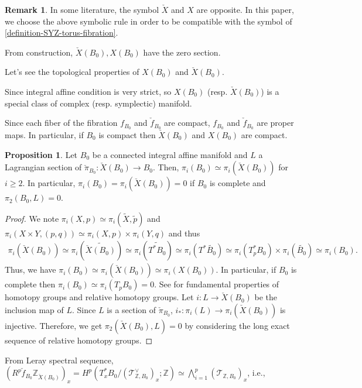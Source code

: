 \documentclass[a4paper,dvipdfmx,reqno,12pt]{amsart}
\theoremstyle{definition}
\newtheorem{proposition}[theorem]{Proposition}
\newtheorem{remark}[theorem]{Remark}
\newcommand{\Z}{\mathbb{Z}}%
\newcommand{\mcal}[1]{\mathcal{#1}}%
\newcommand{\TBZ}{\mcal{T}_{\Z,B_0}}
\numberwithin{equation}{section}
\begin{document}
\begin{remark}
In some literature, the symbol $\check{X}$ and
$X$ are opposite. In this paper, we choose the above
symbolic rule in order to be compatible with the symbol of 
\cref{definition-SYZ-torus-fibration}.
\end{remark}

From construction, $\check{X}(B_0), X(B_0)$ have the zero section.

Let's see the topological properties of $X(B_0)$ and $\check{X}(B_0)$.

Since integral affine condition is very strict, so $X(B_0)$ (resp. $\check{X}(B_0)$) is a special class of complex (resp. symplectic) manifold.

Since each fiber of the fibration $f_{B_0}$ and $\check{f}_{B_0}$ are compact, $f_{B_0}$ and $\check{f}_{B_0}$ are proper maps. In particular, if $B_0$ is compact then $\check{X}(B_0)$ and $X(B_0)$ are compact.

\begin{proposition}
\label{proposition-unobstructed-lagrangian}
Let $B_0$ be a connected integral affine manifold 
and $L$ a Lagrangian section of 
$\check{\pi}_{B_0}\colon \check{X}(B_0)\to B_0$. 
Then, $\pi_i(B_0)\simeq \pi_i(\check{X}(B_0))$ 
for $i\geq 2$.
In particular, 
$\pi_i(B_0)=\pi_i(\check{X}(B_0))=0$ if 
$B_0$ is complete and $\pi_2(B_0,L)=0$.
\end{proposition}
\begin{proof}
We note $\pi_{i}(X,p)\simeq \pi_{i}(\widetilde{X},\tilde{p})$ and $\pi_{i}(X\times Y,(p,q))\simeq \pi_i(X,p)\times \pi_i(Y,q)$ and thus
\begin{align}
\pi_{i}(\check{X}(B_0))\simeq 
\pi_{i}(\widetilde{\check{X}(B_0)})\simeq 
\pi_{i}(\widetilde{T^{*}B_0})\simeq 
\pi_{i}(T^{*}\widetilde{B_0})\simeq 
\pi_{i}(T_p^* B_0)\times \pi_{i}(\widetilde{B_0})\simeq 
\pi_{i}(B_0).
\end{align}
Thus, we have $\pi_{i}(B_0)\simeq \pi_{i}(\check{X}(B_0))\simeq \pi_{i}(X(B_0))$. In particular, if $B_0$ is complete then $\pi_{i}(B_0)\simeq \pi_{i}(T_{p}B_0)=0$. See \cite[Chapter 4]{hatcherAlgebraicTopology2002a} for fundamental properties of homotopy groups and relative homotopy groups.
Let $i\colon L\to \check{X}(B_0)$ be the inclusion map of 
$L$.
Since $L$ is a section of 
$\check{\pi}_{B_0}$, 
$i_*\colon \pi_i(L)\to \pi_i(\check{X}(B_0))$ is 
injective. Therefore, we get 
$\pi_2(\check{X}(B_0),L)=0$ by considering the long exact
sequence of relative homotopy groups.
\end{proof}
From Leray spectral sequence, $(R^{p}\check{f}_{B_0}\Z_{\check{X}(B_0)})_{x}=H^{p}(T^{*}_xB_0/(\TBZ^{\vee})_x;\Z)\simeq \bigwedge_{i=1}^{p}(\TBZ)_{x}$, i.e.,
\end{document}
